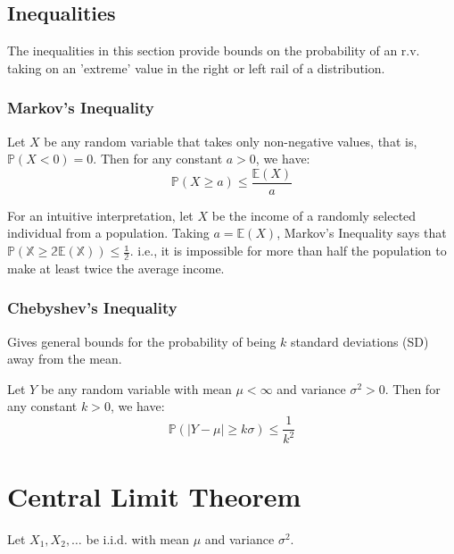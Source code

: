 \documentclass{article}
\begin{document}
\subsection{Inequalities}
The inequalities in this section provide bounds on the probability of an r.v. taking on an 'extreme' value in the right or left rail of a distribution. 

\subsubsection{Markov's Inequality}
\begin{definition}
    Let $X$ be any random variable that takes only non-negative values, that is, $\mathbb{P}(X < 0) = 0$. Then for any constant $a >0$, we have: 
    \begin{equation}
        \mathbb{P}(X \geq a) \leq \frac{\mathbb{E}(X)}{a}
    \end{equation}
\end{definition}

\noindent For an intuitive interpretation, let $X$ be the income of a randomly selected individual from a population. Taking $a = \mathbb{E}(X)$, Markov's Inequality says that $\mathbb{P(X \geq 2 \mathbb{E}(X)) \leq \frac{1}{2}}$. i.e., it is impossible for more than half the population to make at least twice the average income. 

\subsubsection{Chebyshev's Inequality}
Gives general bounds for the probability of being $k$ standard deviations (SD) away from the mean. 

\begin{definition}
    Let $Y$ be any random variable with mean $\mu < \infty$ and variance $\sigma^{2} > 0$. Then for any constant $k>0$, we have: 
    \begin{equation}
        \mathbb{P}(|Y-\mu| \geq k\sigma) \leq \frac{1}{k^{2}}
    \end{equation} 
\end{definition}

\section{Central Limit Theorem}
Let $X_{1}, X_{2}, \dots$ be i.i.d. with mean $\mu$ and variance $\sigma^{2}$. 
\end{document}
